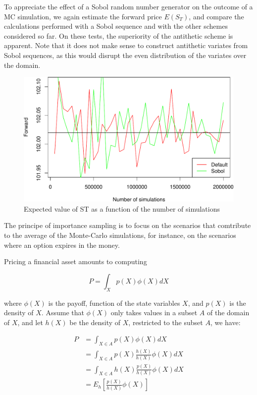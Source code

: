 \documentclass[12pt,]{tufte-book}
\begin{document}
To appreciate the effect of a Sobol random number generator on the outcome of a MC simulation, we again estimate the forward price \(E(S_T)\), and compare the calculations performed with a Sobol sequence and with the other schemes considered so far. On these tests, the superiority of the antithetic scheme is apparent. Note that it does not make sense to construct antithetic variates from Sobol sequences, as this would disrupt the even distribution of the variates over the domain.

\begin{figure}
\includegraphics{800-MC-1_files/figure-latex/mc-forward-sobol-1} \caption[Expected value of ST as a function of the number of simulations]{Expected value of ST as a function of the number of simulations}\label{fig:mc-forward-sobol}
\end{figure}


The principe of importance sampling is to focus on the scenarios that comtribute to the average of the Monte-Carlo simulations, for instance, on the scenarios where an option expires in the money.

Pricing a financial asset amounts to computing

\[
P = \int_X p(X) \phi(X) dX
\]

where \(\phi(X)\) is the payoff, function of the state variables \(X\), and \(p(X)\) is the density of \(X\). Assume that \(\phi(X)\) only takes values in a subset \(A\) of the domain of \(X\), and let \(h(X)\) be the density of \(X\), restricted to the subset \(A\), we have:

\begin{align}
P &= \int_{X \in A} p(X) \phi(X) dX \\
&= \int_{X \in A} p(X) \frac{h(X)}{h(X)} \phi(X) dX \\
&= \int_{X \in A} h(X) \frac{p(X)}{h(X)} \phi(X) dX \\
&= E_h \left[ \frac{p(X)}{h(X)} \phi(X) \right]
\end{align}
\end{document}
